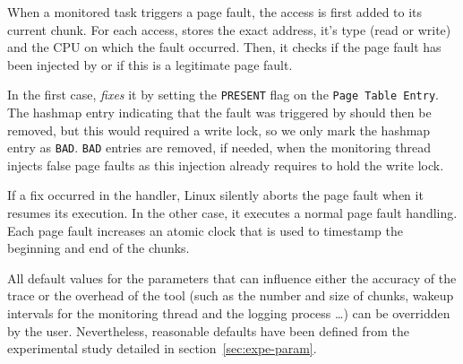 When a monitored task triggers a page fault, the access is first added
to its current chunk. For each access, \Moca stores the exact address, it's type (read
or write) and the CPU on which the fault occurred.  Then, it checks if the page
fault has been injected by \Moca or if this is a legitimate page fault.

In the first
case, \Moca \emph{fixes} it by setting the \texttt{PRESENT} flag on the
\texttt{Page Table Entry}.
The hashmap entry indicating that the fault was triggered by \Moca should then
be removed, but this would required a write lock, so we only mark the hashmap
entry as \texttt{BAD}. \texttt{BAD} entries are removed, if needed, when the
monitoring thread injects false page faults as this injection already requires to hold the
write lock.

If a fix occurred in the \Moca handler, Linux silently aborts the page fault
when it resumes its execution. In the other case, it executes a normal page fault handling. Each page
fault increases an atomic clock that is used to timestamp the beginning and end
of the chunks.

All default values for the parameters that can influence either the accuracy of the trace or the
overhead of the tool (such as the number and size of chunks, wakeup intervals
for the monitoring thread and the logging process \ldots) can be overridden by the
user. Nevertheless, reasonable defaults have been defined from the experimental study
detailed in section~\ref{sec:expe-param}.

